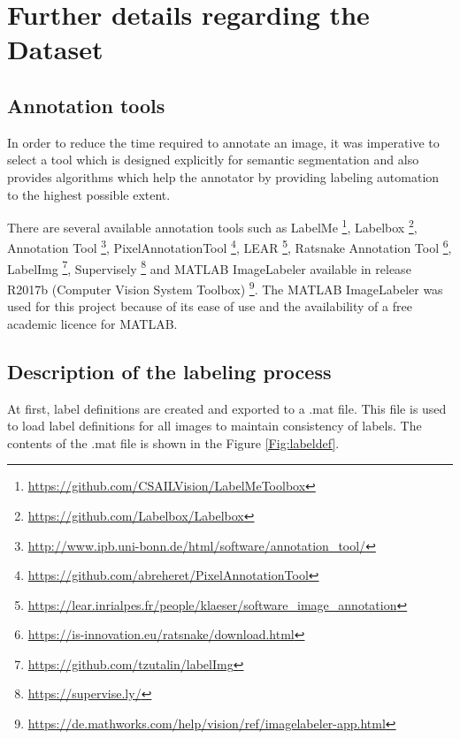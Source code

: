 
\chapter{Further details regarding the Dataset}\label{appendix:dataset}

\section{Annotation tools}

In order to reduce the time required to annotate an image, it was imperative to select a tool which is designed explicitly for semantic segmentation and also provides algorithms which help the annotator by providing labeling automation to the highest possible extent.

There are several available annotation tools such as LabelMe \footnote{\url{https://github.com/CSAILVision/LabelMeToolbox}}, Labelbox \footnote{\url{https://github.com/Labelbox/Labelbox}}, Annotation Tool \footnote{\url{http://www.ipb.uni-bonn.de/html/software/annotation_tool/}}, PixelAnnotationTool \footnote{\url{https://github.com/abreheret/PixelAnnotationTool}}, LEAR \footnote{\url{https://lear.inrialpes.fr/people/klaeser/software_image_annotation}}, Ratsnake Annotation Tool \footnote{\url{https://is-innovation.eu/ratsnake/download.html}}, LabelImg \footnote{\url{https://github.com/tzutalin/labelImg}}, Supervisely \footnote{\url{https://supervise.ly/}} and MATLAB ImageLabeler available in release R2017b (Computer Vision System Toolbox) \footnote{\url{https://de.mathworks.com/help/vision/ref/imagelabeler-app.html}}. The MATLAB ImageLabeler was used for this project because of its ease of use and the availability of a free academic licence for MATLAB.

\section{Description of the labeling process}
\label{section:process}
At first, label definitions are created and exported to a .mat file. This file is used to load label definitions for all images to maintain consistency of labels. The contents of the .mat file is shown in the Figure \ref{Fig:labeldef}.
	
